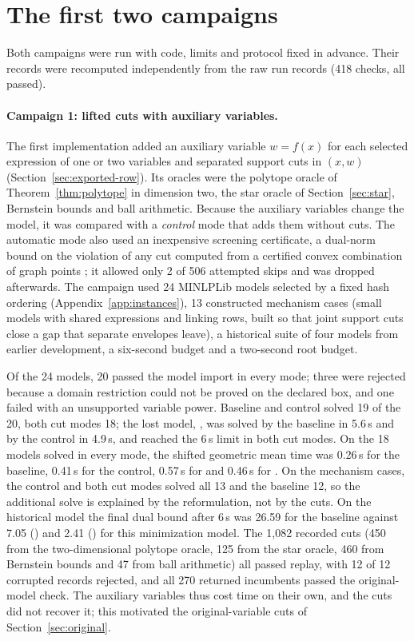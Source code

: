 \section{The first two campaigns}\label{app:campaigns12}

Both campaigns were run with code, limits and protocol fixed in advance. Their
records were recomputed independently from the raw run records (418 checks,
all passed).

\paragraph{Campaign 1: lifted cuts with auxiliary variables.}
The first implementation added an auxiliary variable $w=f(x)$ for each
selected expression of one or two variables and separated support cuts in
$(x,w)$ (Section~\ref{sec:exported-row}). Its oracles were the polytope oracle
of Theorem~\ref{thm:polytope} in dimension two, the star oracle of
Section~\ref{sec:star}, Bernstein bounds and ball arithmetic. Because the
auxiliary variables change the model, it was compared with a \emph{control}
mode that adds them without cuts. The automatic mode also used an inexpensive
screening certificate, a dual-norm bound on the violation of any cut computed
from a certified convex combination of graph points \citep{Mangasarian1999};
it allowed only 2 of 506 attempted skips and was dropped afterwards. The
campaign used 24 MINLPLib models selected by a fixed hash ordering
(Appendix~\ref{app:instances}), 13 constructed mechanism cases (small models
with shared expressions and linking rows, built so that joint support cuts
close a gap that separate envelopes leave), a historical suite of four models
from earlier development, a six-second budget and a two-second root budget.

Of the 24 models, 20 passed the model import in every mode; three were rejected
because a domain restriction could not be proved on the declared box, and one
failed with an unsupported variable power. Baseline and control solved 19 of
the 20, both cut modes 18; the lost model, , was solved by
the baseline in 5.6\,s and by the control in 4.9\,s, and reached the 6\,s limit in
both cut modes. On the 18 models solved in every mode, the shifted geometric
mean time was 0.26\,s for the baseline, 0.41\,s for the control, 0.57\,s for
 and 0.46\,s for . On the mechanism cases, the control and
both cut modes solved all 13 and the baseline 12, so the additional solve is
explained by the reformulation, not by the cuts. On the historical model
 the final dual bound after 6\,s was 26.59 for the baseline
against 7.05 () and 2.41 () for this minimization model. The
1{,}082 recorded cuts (450 from the two-dimensional polytope oracle, 125 from the
star oracle, 460 from Bernstein bounds and 47 from ball arithmetic) all passed
replay, with 12 of 12 corrupted records rejected, and all 270 returned
incumbents passed the original-model check. The auxiliary variables thus cost
time on their own, and the cuts did not recover it; this motivated the
original-variable cuts of Section~\ref{sec:original}.

